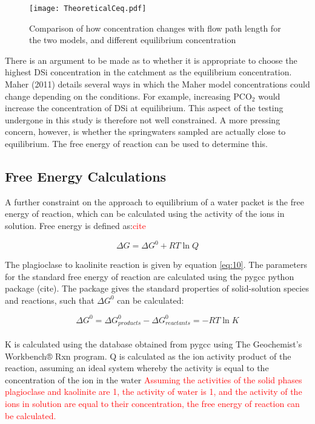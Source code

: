 \begin{figure}[h]
    \centering
    \texttt{[image: TheoreticalCeq.pdf]}
    \caption{Comparison of how concentration changes with flow path length for the two models, and different equilibrium concentration}
    \label{fig:discussion8}
\end{figure}

\FloatBarrier

There is an argument to be made as to whether it is appropriate to choose the highest DSi concentration in the catchment as the equilibrium concentration. Maher (2011) details several ways in which the Maher model concentrations could change depending on the conditions. For example, increasing PCO$_2$ would increase the concentration of DSi at equilibrium. This aspect of the testing undergone in this study is therefore not well constrained. A more pressing concern, however, is whether the springwaters sampled are actually close to equilibrium. The free energy of reaction can be used to determine this.

\subsection{Free Energy Calculations}

A further constraint on the approach to equilibrium of a water packet is the free energy of reaction, which can be calculated using the activity of the ions in solution. Free energy is defined as:\textcolor{red}{cite}

\begin{equation}
    \Delta G = \Delta G^0 + RT \ln Q
\end{equation}

The plagioclase to kaolinite reaction is given by equation \ref{eq:10}. The parameters for the standard free energy of reaction are calculated using the pygcc python package (cite). The package gives the standard properties of solid-solution species and reactions, such that $\Delta G^0$ can be calculated:

\begin{equation}
    \Delta G^0 = \Delta G^0_{products} - \Delta G^0_{reactants} = -RT \ln K
\end{equation}\\
K is calculated using the database obtained from pygcc using The Geochemist's Workbench® Rxn program. Q is calculated as the ion activity product of the reaction, assuming an ideal system whereby the activity is equal to the concentration of the ion in the water \textcolor{red}{Assuming the activities of the solid phases plagioclase and kaolinite are 1, the activity of water is 1, and the activity of the ions in solution are equal to their concentration, the free energy of reaction can be calculated. }

